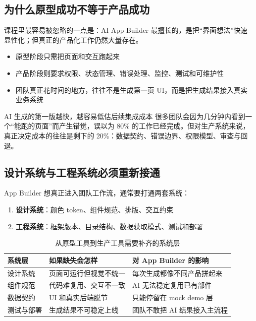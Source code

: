 \documentclass[a4paper]{article}
\begin{document}
\subsection{为什么原型成功不等于产品成功}

课程里最容易被忽略的一点是：AI App Builder 最擅长的，是把“界面想法”快速显性化；但真正的产品化工作仍然大量存在。

\begin{itemize}
    \item 原型阶段只需把页面和交互跑起来
    \item 产品阶段则要求权限、状态管理、错误处理、监控、测试和可维护性
    \item 团队真正花时间的地方，往往不是生成第一页 UI，而是把生成结果接入真实业务系统
\end{itemize}

\begin{warningbox}{AI 生成的第一版越快，越容易低估后续集成成本}
很多团队会因为几分钟内看到一个“能跑的页面”而产生错觉，误以为 80\% 的工作已经完成。但对生产系统来说，真正决定成本的往往是剩下的 20\%：数据契约、错误边界、权限模型、审查与回退。
\end{warningbox}

\subsection{设计系统与工程系统必须重新接通}

App Builder 想真正进入团队工作流，通常要打通两套系统：

\begin{enumerate}
    \item \textbf{设计系统}：颜色 token、组件规范、排版、交互约束
    \item \textbf{工程系统}：框架版本、目录结构、数据获取模式、测试和部署
\end{enumerate}

\begin{table}[H]
\centering
\begin{tabular}{p{} p{} p{}}
\toprule
系统层 & 如果缺失会怎样 & 对 App Builder 的影响 \\
\midrule
设计系统 & 页面可运行但视觉不统一 & 每次生成都像不同产品拼起来 \\
组件规范 & 代码难复用、交互不一致 & AI 无法稳定复用已有部件 \\
数据契约 & UI 和真实后端脱节 & 只能停留在 mock demo 层 \\
测试与部署 & 生成结果不可稳定上线 & 团队不敢把 AI 结果接入主流程 \\
\bottomrule
\end{tabular}
\caption{从原型工具到生产工具需要补齐的系统层}
\end{table}
\end{document}
